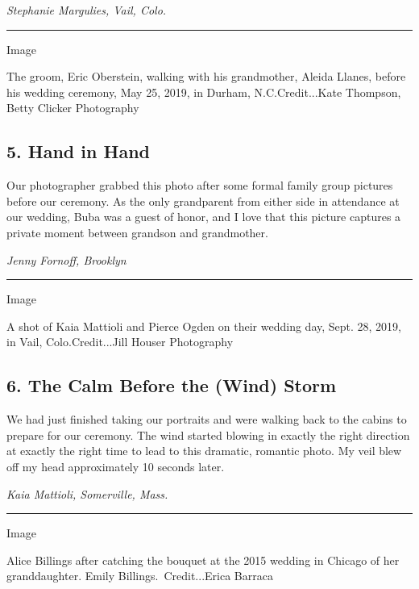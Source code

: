 \emph{Stephanie Margulies, Vail, Colo.}

\begin{center}\rule{0.5\linewidth}{\linethickness}\end{center}

Image

The groom, Eric Oberstein, walking with his grandmother, Aleida Llanes,
before his wedding ceremony, May 25, 2019, in Durham, N.C.Credit...Kate
Thompson, Betty Clicker Photography

\hypertarget{5-hand-in-hand}{%
\subsection{5. Hand in Hand}\label{5-hand-in-hand}}

Our photographer grabbed this photo after some formal family group
pictures before our ceremony. As the only grandparent from either side
in attendance at our wedding, Buba was a guest of honor, and I love that
this picture captures a private moment between grandson and grandmother.

\emph{Jenny Fornoff, Brooklyn}

\begin{center}\rule{0.5\linewidth}{\linethickness}\end{center}

Image

A shot of Kaia Mattioli and Pierce Ogden on their wedding day, Sept. 28,
2019, in Vail, Colo.Credit...Jill Houser Photography

\hypertarget{6-the-calm-before-the-wind-storm}{%
\subsection{6. The Calm Before the (Wind)
Storm}\label{6-the-calm-before-the-wind-storm}}

We had just finished taking our portraits and were walking back to the
cabins to prepare for our ceremony. The wind started blowing in exactly
the right direction at exactly the right time to lead to this dramatic,
romantic photo. My veil blew off my head approximately 10 seconds later.

\emph{Kaia Mattioli, Somerville, Mass.}

\begin{center}\rule{0.5\linewidth}{\linethickness}\end{center}

Image

Alice Billings after catching the bouquet at the 2015 wedding in Chicago
of her granddaughter. Emily Billings.~Credit...Erica Barraca

